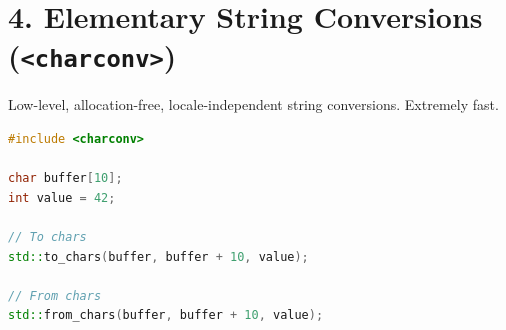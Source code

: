 \hypertarget{elementary-string-conversions-charconv}{%
\section{\texorpdfstring{4. Elementary String Conversions
(\texttt{\textless{}charconv\textgreater{}})}{4. Elementary String Conversions (\textless charconv\textgreater)}}\label{elementary-string-conversions-charconv}}

Low-level, allocation-free, locale-independent string conversions.
Extremely fast.

\begin{lstlisting}[language={C++}]
#include <charconv>

char buffer[10];
int value = 42;

// To chars
std::to_chars(buffer, buffer + 10, value);

// From chars
std::from_chars(buffer, buffer + 10, value);
\end{lstlisting}
